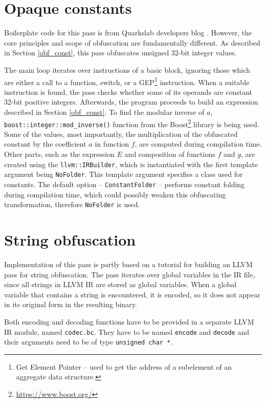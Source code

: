 \documentclass[
  digital, %
  notable,   %
  twoside, %
  nolof,     %
  nolot,     %
]{fithesis3}
\theoremstyle{definition}
\begin{document}
\section{Opaque constants}
Boilerplate code for this pass is from Quarkslab developers blog \cite{atrocities}. However, the core principles and scope of obfuscation are fundamentally different. As described in Section \ref{obf_const}, this pass obfuscates unsigned 32-bit integer values. 

The main loop iterates over instructions of a basic block, ignoring those which are either a call to a function, switch, or a GEP\footnote{Get Element Pointer -- used to get the address of a subelement of an aggregate data structure.} instruction. When a suitable instruction is found, the pass checks whether some of its operands are constant 32-bit positive integers. Afterwards, the program proceeds to build an expression described in Section \ref{obf_const}. To find the modular inverse of $a$, \texttt{boost::integer::mod\_inverse()} function from the Boost\footnote{\url{https://www.boost.org/}} library is being used. Some of the values, most importantly, the multiplication of the obfuscated constant by the coefficient $a$ in function $f$, are computed during compilation time. Other parts, such as the expression $E$ and composition of functions $f$ and $g$, are created using the \texttt{llvm::IRBuilder}, which is instantiated with the first template argument being \texttt{NoFolder}. This template argument specifies a class used for constants. The default option -- \texttt{ConstantFolder} -- performs constant folding during compilation time, which could possibly weaken this obfuscating transformation, therefore \texttt{NoFolder} is used. 



\section{String obfuscation}
Implementation of this pass is partly based on a tutorial \cite{blog_strobf} for building an LLVM pass for string obfuscation. The pass iterates over global variables in the IR file, since all strings in LLVM IR are stored as global variables. When a global variable that contains a string is encountered, it is encoded, so it does not appear in its original form in the resulting binary. 

Both encoding and decoding functions have to be provided in a separate LLVM IR module, named \texttt{codec.bc}. They have to be named \texttt{encode} and \texttt{decode} and their arguments need to be of type \texttt{unsigned char *}. 
\end{document}
